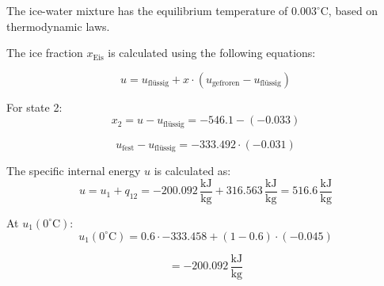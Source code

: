 The ice-water mixture has the equilibrium temperature of \( 0.003^\circ\text{C} \), based on thermodynamic laws.

The ice fraction \( x_{\text{Eis}} \) is calculated using the following equations:

\[
u = u_{\text{flüssig}} + x \cdot (u_{\text{gefroren}} - u_{\text{flüssig}})
\]

For state 2:
\[
x_2 = u - u_{\text{flüssig}} = -546.1 - (-0.033)
\]

\[
u_{\text{fest}} - u_{\text{flüssig}} = -333.492 \cdot (-0.031)
\]

The specific internal energy \( u \) is calculated as:
\[
u = u_1 + q_{12} = -200.092 \, \frac{\text{kJ}}{\text{kg}} + 316.563 \, \frac{\text{kJ}}{\text{kg}} = 516.6 \, \frac{\text{kJ}}{\text{kg}}
\]

At \( u_1(0^\circ\text{C}) \):
\[
u_1(0^\circ\text{C}) = 0.6 \cdot -333.458 + (1 - 0.6) \cdot (-0.045)
\]

\[
= -200.092 \, \frac{\text{kJ}}{\text{kg}}
\]